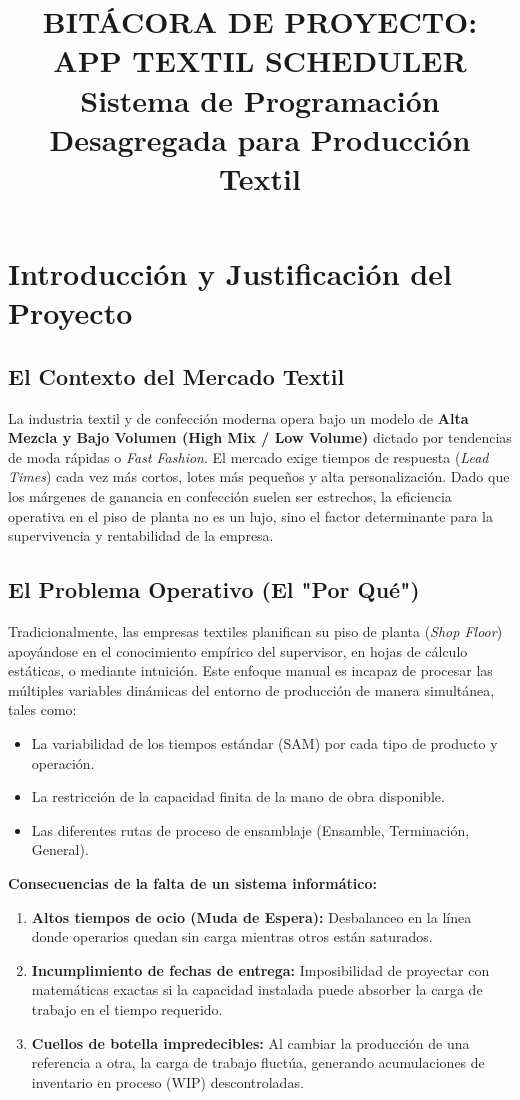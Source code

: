 \documentclass[12pt,a4paper]{article}
\title{\textbf{BITÁCORA DE PROYECTO: APP TEXTIL SCHEDULER}\\ Sistema de Programación Desagregada para Producción Textil}
\author{}
\date{}
\begin{document}
\maketitle

\section{Introducción y Justificación del Proyecto}

\subsection{El Contexto del Mercado Textil}
La industria textil y de confección moderna opera bajo un modelo de \textbf{Alta Mezcla y Bajo Volumen (High Mix / Low Volume)} dictado por tendencias de moda rápidas o \textit{Fast Fashion}. El mercado exige tiempos de respuesta (\textit{Lead Times}) cada vez más cortos, lotes más pequeños y alta personalización. Dado que los márgenes de ganancia en confección suelen ser estrechos, la eficiencia operativa en el piso de planta no es un lujo, sino el factor determinante para la supervivencia y rentabilidad de la empresa.

\subsection{El Problema Operativo (El "Por Qué")}
Tradicionalmente, las empresas textiles planifican su piso de planta (\textit{Shop Floor}) apoyándose en el conocimiento empírico del supervisor, en hojas de cálculo estáticas, o mediante intuición. Este enfoque manual es incapaz de procesar las múltiples variables dinámicas del entorno de producción de manera simultánea, tales como:
\begin{itemize}
    \item La variabilidad de los tiempos estándar (SAM) por cada tipo de producto y operación.
    \item La restricción de la capacidad finita de la mano de obra disponible.
    \item Las diferentes rutas de proceso de ensamblaje (Ensamble, Terminación, General).
\end{itemize}

\textbf{Consecuencias de la falta de un sistema informático:}
\begin{enumerate}
    \item \textbf{Altos tiempos de ocio (Muda de Espera):} Desbalanceo en la línea donde operarios quedan sin carga mientras otros están saturados.
    \item \textbf{Incumplimiento de fechas de entrega:} Imposibilidad de proyectar con matemáticas exactas si la capacidad instalada puede absorber la carga de trabajo en el tiempo requerido.
    \item \textbf{Cuellos de botella impredecibles:} Al cambiar la producción de una referencia a otra, la carga de trabajo fluctúa, generando acumulaciones de inventario en proceso (WIP) descontroladas.
\end{enumerate}
\end{document}
